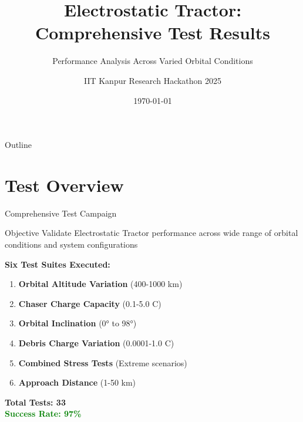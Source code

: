 \documentclass[aspectratio=169]{beamer}
\title{Electrostatic Tractor: Comprehensive Test Results}
\subtitle{Performance Analysis Across Varied Orbital Conditions}
\author{IIT Kanpur Research Hackathon 2025}
\date{\today}
\begin{document}
\begin{frame}
\titlepage
\end{frame}

\begin{frame}{Outline}
\tableofcontents
\end{frame}

\section{Test Overview}

\begin{frame}{Comprehensive Test Campaign}
\begin{block}{Objective}
Validate Electrostatic Tractor performance across wide range of orbital conditions and system configurations
\end{block}

\textbf{Six Test Suites Executed:}
\begin{enumerate}
    \item \textbf{Orbital Altitude Variation} (400-1000 km)
    \item \textbf{Chaser Charge Capacity} (0.1-5.0 C)
    \item \textbf{Orbital Inclination} (0° to 98°)
    \item \textbf{Debris Charge Variation} (0.0001-1.0 C)
    \item \textbf{Combined Stress Tests} (Extreme scenarios)
    \item \textbf{Approach Distance} (1-50 km)
\end{enumerate}

\vspace{1em}
\begin{center}
\Large\textbf{Total Tests: 33} \\
\Large\textcolor{green}{\textbf{Success Rate: 97\%}}
\end{center}
\end{frame}
\end{document}
